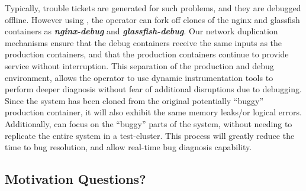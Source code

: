 Typically, trouble tickets are generated for such problems, and they are debugged offline.
However using \parikshan, the operator can fork off clones of the nginx and glassfish containers as \textbf{\textit{nginx-debug}} and \textbf{\textit{glassfish-debug}}.
Our network duplication mechanisms ensure that the debug containers receive the same inputs as the production containers, and that the production containers continue to provide service without interruption.
This separation of the production and debug environment, allows the operator to use dynamic instrumentation tools to perform deeper diagnosis without fear of additional disruptions due to debugging.
Since the system has been cloned from the original potentially ``buggy'' production container, it will also exhibit the same memory leaks/or logical errors.
Additionally, \parikshan can focus on the ``buggy'' parts of the system, without needing to replicate the entire system in a test-cluster.
This process will greatly reduce the time to bug resolution, and allow real-time bug diagnosis capability.


\iffalse
\subsection{Motivation Questions?}

